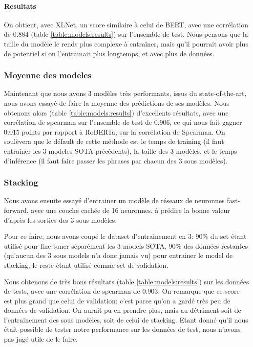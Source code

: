 \documentclass[11pt,a4paper, french]{article}
\begin{document}

\paragraph{Resultats} On obtient, avec XLNet, un score similaire à celui de BERT, avec une corrélation de 0.884 (table \ref{table:models:results}) sur l'ensemble de test. Nous pensons que la taille du modèle le rends plus complexe à entraîner, mais qu'il pourrait avoir plus de potentiel si on l'entrainait plus longtemps, et avec plus de données.

%
\subsubsection{Moyenne des modeles}

Maintenant que nous avons 3 modèles très performants, issus du state-of-the-art, nous avons essayé de faire la moyenne des prédictions de ses modèles. Nous obtenons alors (table \ref{table:models:results}) d'excellents résultats, avec une corrélation de spearman sur l'ensemble de test de 0.906, ce qui nous fait gagner 0.015 points par rapport à RoBERTa, sur la corrélation de Spearman. On soulèvera que le défault de cette méthode est le temps de training (il faut entrainer les 3 modeles SOTA précédents), la taille des 3 modèles, et le temps d'inférence (il faut faire passer les phrases par chacun des 3 sous modèles).

%
\subsubsection{Stacking}

Nous avons ensuite essayé d'entrainer un modèle de réseaux de neuronnes fast-forward, avec une couche cachée de 16 neuronnes, à prédire la bonne valeur d'après les sorties des 3 sous modèles.

Pour ce faire, nous avons coupé le dataset d'entrainement en 3: 90\% du set étant utilisé pour fine-tuner séparément les 3 models SOTA, 90\% des données restantes (qu'aucun des 3 sous models n'a donc jamais vu) pour entrainer le model de stacking, le reste étant utilisé comme set de validation.

Nous obtenons de très bons résultats (table \ref{table:models:results}) sur les données de tests, avec une corrélation de spearman de 0.903. On remarque que ce score est plus grand que celui de validation: c'est parce qu'on a gardé très peu de données de validation. On aurait pu en prendre plus, mais au détriment soit de l'entrainement des sous modèles, soit de celui de stacking. Etant donné qu'il nous était possible de tester notre performance sur les données de test, nous n'avons pas jugé utile de le faire.
\end{document}
